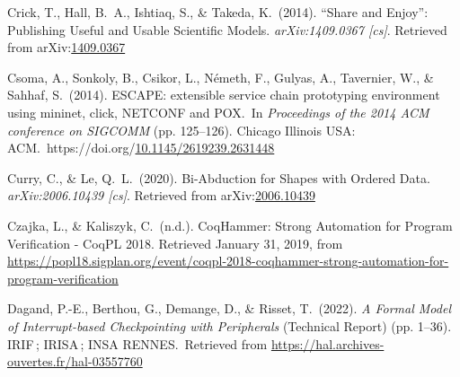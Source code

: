 \documentclass[12pt,twoside]{article}
\begin{document}
{\begin{thebibliography}{1079}
\mdbibitemlabel{}Crick, T., Hall, B.~A., Ishtiaq, S., \& Takeda, K.~(2014). \textquotedblleft{}Share and Enjoy\textquotedblright{}: Publishing Useful and Usable Scientific Models. \emph{arXiv:1409.0367 {}[cs]}. Retrieved from arXiv:\href{http://arxiv.org/abs/1409.0367}{1409.0367}%

\mdbibitemlabel{}Csoma, A., Sonkoly, B., Csikor, L., Németh, F., Gulyas, A., Tavernier, W., \& Sahhaf, S.~(2014). ESCAPE: extensible service chain prototyping environment using mininet, click, NETCONF and POX.~In \emph{Proceedings of the 2014 ACM conference on SIGCOMM} (pp. 125–126). Chicago Illinois USA: ACM.~https://doi.org/\href{https://dx.doi.org/10.1145/2619239.2631448}{10.1145/2619239.2631448}%

\mdbibitemlabel{}Curry, C., \& Le, Q.~L.~(2020). Bi-Abduction for Shapes with Ordered Data. \emph{arXiv:2006.10439 {}[cs]}. Retrieved from arXiv:\href{http://arxiv.org/abs/2006.10439}{2006.10439}%

\mdbibitemlabel{}Czajka, L., \& Kaliszyk, C.~(n.d.). CoqHammer: Strong Automation for Program Verification - CoqPL 2018. Retrieved January 31, 2019, from \href{https://popl18.sigplan.org/event/coqpl-2018-coqhammer-strong-automation-for-program-verification}{{\ttfamily https://\hspace{0pt}popl18.\hspace{0pt}sigplan.\hspace{0pt}org/\hspace{0pt}event/\hspace{0pt}coqpl-\hspace{0pt}2018-\hspace{0pt}coqhammer-\hspace{0pt}strong-\hspace{0pt}automation-\hspace{0pt}for-\hspace{0pt}program-\hspace{0pt}verification}}%

\mdbibitemlabel{}Dagand, P.-E., Berthou, G., Demange, D., \& Risset, T.~(2022). \emph{A Formal Model of Interrupt-based Checkpointing with Peripherals} (Technical Report) (pp. 1–36). IRIF ; IRISA ; INSA RENNES.~Retrieved from \href{https://hal.archives-ouvertes.fr/hal-03557760}{{\ttfamily https://\hspace{0pt}hal.\hspace{0pt}archives-\hspace{0pt}ouvertes.\hspace{0pt}fr/\hspace{0pt}hal-\hspace{0pt}03557760}}%


\end{thebibliography}}
\end{document}

